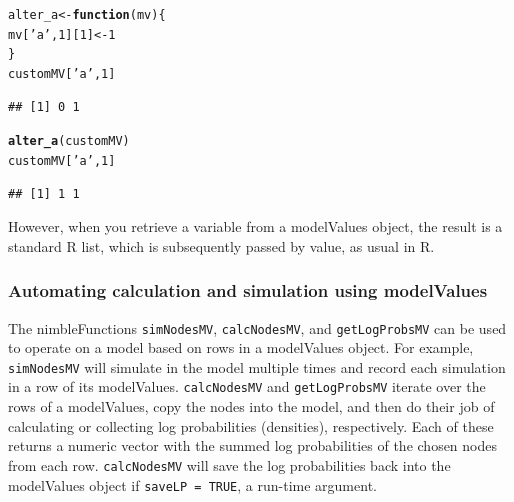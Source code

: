 \documentclass[12pt,oneside]{book}\usepackage[]{graphicx}\usepackage[]{color}
\makeatletter
\newcommand{\hlnum}[1]{\textcolor[rgb]{0.686,0.059,0.569}{#1}}%
\newcommand{\hlstr}[1]{\textcolor[rgb]{0.192,0.494,0.8}{#1}}%
\newcommand{\hlstd}[1]{\textcolor[rgb]{0.345,0.345,0.345}{#1}}%
\newcommand{\hlkwa}[1]{\textcolor[rgb]{0.161,0.373,0.58}{\textbf{#1}}}%
\newcommand{\hlkwb}[1]{\textcolor[rgb]{0.69,0.353,0.396}{#1}}%
\newcommand{\hlkwc}[1]{\textcolor[rgb]{0.333,0.667,0.333}{#1}}%
\newcommand{\hlkwd}[1]{\textcolor[rgb]{0.737,0.353,0.396}{\textbf{#1}}}%
\newenvironment{kframe}{%
 \def\at@end@of@kframe{}%
 \ifinner\ifhmode%
  \def\at@end@of@kframe{\end{minipage}}%
  \begin{minipage}{\columnwidth}%
 \fi\fi%
 \def\FrameCommand##1{\hskip\@totalleftmargin \hskip-\fboxsep
 \colorbox{shadecolor}{##1}\hskip-\fboxsep
     \hskip-\linewidth \hskip-\@totalleftmargin \hskip\columnwidth}%
 \MakeFramed {\advance\hsize-\width
   \@totalleftmargin\z@ \linewidth\hsize
   \@setminipage}}%
 {\par\unskip\endMakeFramed%
 \at@end@of@kframe}
\newenvironment{knitrout}{}{} %
\def\cd#1{\texttt{#1}}
\makeatother
\begin{document}
\begin{knitrout}
\color{fgcolor}\begin{kframe}
\begin{alltt}
\hlstd{alter_a} \hlkwb{<-} \hlkwa{function}\hlstd{(}\hlkwc{mv}\hlstd{)\{}
  \hlstd{mv[}\hlstr{'a'}\hlstd{,}\hlnum{1}\hlstd{][}\hlnum{1}\hlstd{]} \hlkwb{<-} \hlnum{1}
\hlstd{\}}
\hlstd{customMV[}\hlstr{'a'}\hlstd{,} \hlnum{1}\hlstd{]}
\end{alltt}
\begin{verbatim}
## [1] 0 1
\end{verbatim}
\begin{alltt}
\hlkwd{alter_a}\hlstd{(customMV)}
\hlstd{customMV[}\hlstr{'a'}\hlstd{,}\hlnum{1}\hlstd{]}
\end{alltt}
\begin{verbatim}
## [1] 1 1
\end{verbatim}
\end{kframe}
\end{knitrout}

However, when you retrieve a variable from a modelValues object, the result is a standard R list, which is subsequently passed by value, as usual in R.



\subsubsection{Automating calculation and simulation using modelValues}



The nimbleFunctions \cd{simNodesMV}, \cd{calcNodesMV}, and \cd{getLogProbsMV}
can be used to operate on a model based on rows in a modelValues object.
For example,
\cd{simNodesMV} will simulate in the model multiple times and record
each simulation in a row of its modelValues.  \cd{calcNodesMV} and
\cd{getLogProbsMV} iterate over the rows of a modelValues, copy the
nodes into the model, and then do their job of calculating or
collecting log probabilities (densities), respectively.  Each of these
returns a numeric vector with the summed log probabilities of the
chosen nodes from each row. \cd{calcNodesMV} will 
  save the log probabilities back into the modelValues object if
  \cd{saveLP = TRUE}, a run-time argument. 
\end{document}

